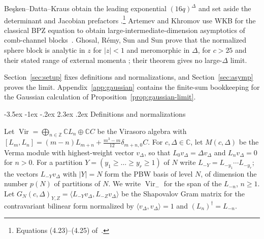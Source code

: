 \documentclass[twoside,10pt]{article}
\makeatletter
\numberwithin{equation}{section}
\theoremstyle{slbody}
\theoremstyle{definition}
\theoremstyle{remark}
\newcommand{\Vir}{\operatorname{Vir}}
\renewcommand{\section}{%
  \@startsection{section}{1}{\z@}%
    {-3.5ex \@plus -1ex \@minus -.2ex}%
    {2.3ex \@plus .2ex}%
    {\normalfont\large\bfseries}}
\makeatother
\begin{document}
Be\c{s}ken--Datta--Kraus obtain the leading exponential \((16q)^\Delta\)
and set aside the determinant and Jacobian prefactors
\cite[\S4.3]{BeskenDattaKraus2019}.\footnote{Equations (4.23)--(4.25) of~\cite{BeskenDattaKraus2019}.}  Artemev and Khromov use
WKB for the classical BPZ equation to obtain large-intermediate-dimension
asymptotics of comb-channel blocks~\cite{ArtemevKhromov2026}.  Ghosal, R\'emy,
Sun and Sun prove that the normalized sphere block is analytic in \(z\) for
\(|z|<1\) and meromorphic in \(\Delta\), for \(c>25\) and their stated range of
external momenta \cite[Theorem~1.2]{GhosalRemySunSun2022}; their theorem gives
no large-\(\Delta\) limit.

Section~\ref{sec:setup} fixes definitions and normalizations, and
Section~\ref{sec:asymp} proves the limit.  Appendix~\ref{app:gaussian}
contains the finite-sum bookkeeping for the Gaussian calculation of
Proposition~\ref{prop:gaussian-limit}.

\section{Definitions and normalizations}\label{sec:setup}

Let \(\Vir=\bigoplus_{n\in\mathbb Z}\mathbb C L_n\oplus\mathbb C C\) be the
Virasoro algebra with
\([L_m,L_n]=(m-n)L_{m+n}+\frac{m^3-m}{12}\delta_{m+n,0}C\).  For
\(c,\Delta\in\mathbb C\), let \(M(c,\Delta)\) be the Verma module with
highest-weight vector \(v_\Delta\), so that \(L_0v_\Delta=\Delta v_\Delta\)
and \(L_n v_\Delta=0\) for \(n>0\).  For a partition
\(Y=(y_1\geq\dots\geq y_r\geq1)\) of \(N\) write
\(L_{-Y}=L_{-y_1}\cdots L_{-y_r}\); the vectors \(L_{-Y}v_\Delta\) with
\(|Y|=N\) form the PBW basis of level \(N\), of dimension the number \(p(N)\) of
partitions of \(N\).  We write \(\Vir_-\) for the span of the \(L_{-n}\),
\(n\geq1\).  Let
\(G_N(c,\Delta)_{Y,Z}=\langle L_{-Y}v_\Delta,L_{-Z}v_\Delta\rangle\) be the
Shapovalov Gram matrix for the contravariant bilinear form normalized by
\(\langle v_\Delta,v_\Delta\rangle=1\) and \((L_n)^\dagger=L_{-n}\).
\end{document}
